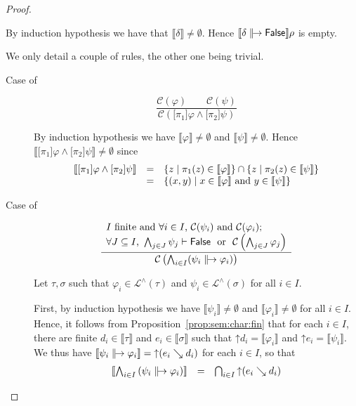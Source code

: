 \documentclass[%
  a4paper,
  UKenglish,
  cleveref,
  autoref,
  thm-restate,
  numberwithinsect,
]{lipics-v2021}
\newcommand\sle\subseteq
\newcommand\thesis{\vdash}
\newcommand\up{\mathord{\uparrow}}
\newcommand\I[1]{\llbracket #1 \rrbracket} %
\newcommand\C{\mathcal{C}}		%
\newcommand\temp[1]{\mathsf{#1}}
\newcommand\False{\temp{False}}
\newcommand\val{\rho}	%
\newcommand\defrealto{\mathrel\parallel\joinrel\to}
\newcommand\realto{\mathrel{\defrealto}}
\newcommand\PT{\tau}		%
\newcommand\PTbis{\sigma}	%
\newcommand\step{\searrow}
\newcommand\Lang{\mathcal{L}}
\newcommand\form[1]{\lbrack #1 \rbrack}
\begin{document}
\begin{proof}
\begin{description}
By induction hypothesis we have that $\I\delta \neq \emptyset$.
Hence $\I{\delta \realto \False}\val$ is empty.

\item[Rules for the consistency predicate $\C$ in Figure~\ref{fig:consist}.]
We only detail a couple of rules, the other one being trivial.
\begin{description}
\item[Case of]
\[
\dfrac{\C(\varphi) 
  \qquad
  \C(\psi)}
  {\C(\form{\pi_1}\varphi \land \form{\pi_2}\psi)}
\]

\noindent
By induction hypothesis we have $\I\varphi \neq \emptyset$
and $\I\psi \neq \emptyset$.
Hence $\I{\form{\pi_1}\varphi \land \form{\pi_2}\psi} \neq \emptyset$
since
\[
\begin{array}{l l l}
  \I{\form{\pi_1}\varphi \land \form{\pi_2}\psi}
& =
& \left\{ z \mid \pi_1(z) \in \I\varphi \right\}
  \cap
  \left\{ z \mid \pi_2(z) \in \I\psi \right\}
\\
%
& =
& \left\{ (x,y) \mid \text{$x \in \I\varphi$ and $y \in \I\psi$} \right\}
\end{array}
\]

\item[Case of]
\[
\dfrac{\begin{array}{l}
  \text{$I$ finite and $\forall i \in I$,}~
  \C(\psi_i) 
  ~\text{and}~
  \C(\varphi_i) ;
  \\
  \text{$\forall J \sle I$,}~
  \bigwedge_{j \in J} \psi_j \thesis \False
  ~~\text{or}~~
  \C\left( \bigwedge_{j \in J} \varphi_j \right)
  \end{array}}
  {\C\left( \bigwedge_{i \in I}(\psi_i \realto \varphi_i) \right)}
\]

\noindent
Let $\PT,\PTbis$ such that
$\varphi_i \in \Lang^\land(\PT)$ and $\psi_i \in \Lang^\land(\PTbis)$
for all $i \in I$.

First, by induction hypothesis 
we have
$\I{\psi_i} \neq \emptyset$
and
$\I{\varphi_i} \neq \emptyset$
for all $i \in I$.
Hence, it follows from Proposition~\ref{prop:sem:char:fin}
that for each $i \in I$,
there are finite $d_i \in \I\PT$
and $e_i \in \I\PTbis$
such that
$\up d_i = \I{\varphi_i}$
and
$\up e_i = \I{\psi_i}$.
We thus have
$\I{\psi_i \realto \varphi_i} = \up(e_i \step d_i)$
for each $i \in I$,
so that
\[
\begin{array}{l l l}
  \I{\bigwedge_{i \in I} \left( \psi_i \realto \varphi_i \right)}
& =
& \bigcap_{i \in I} \up(e_i \step d_i)
\end{array}
\]



\end{description}
\end{description}
\end{proof}
\end{document}
